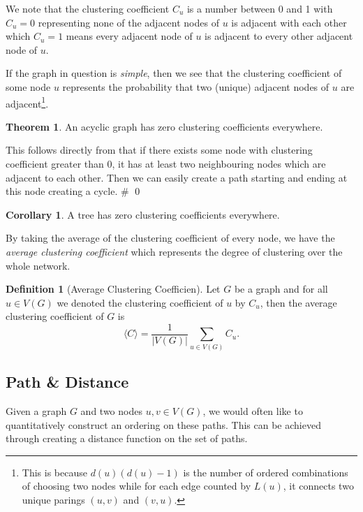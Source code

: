 \documentclass[
]{article}
\theoremstyle{definition}
\newtheorem{theorem}{Theorem}
\newtheorem{corollary}{Corollary}[theorem]
\theoremstyle{definition}
\newtheorem{definition}{Definition}[section]
\begin{document}
We note that the clustering coefficient \(C_u\) is a number between 0
and 1 with \(C_u = 0\) representing none of the adjacent nodes of \(u\)
is adjacent with each other which \(C_u = 1\) means every adjacent node
of \(u\) is adjacent to every other adjacent node of \(u\).

If the graph in question is \emph{simple}, then we see that the
clustering coefficient of some node \(u\) represents the probability
that two (unique) adjacent nodes of \(u\) are
adjacent\footnote{This is because \(d(u)(d(u) - 1)\) 
is the number of ordered combinations of choosing two nodes while for each 
edge counted by \(L(u)\), it connects two unique parings \((u, v)\) and 
\((v, u)\).}.

\begin{theorem}
  An acyclic graph has zero clustering coefficients everywhere.
\end{theorem}
\proof

This follows directly from that if there exists some node with
clustering coefficient greater than 0, it has at least two neighbouring
nodes which are adjacent to each other. Then we can easily create a path
starting and ending at this node creating a cycle. \# \qed

\begin{corollary}
  A tree has zero clustering coefficients everywhere.
\end{corollary}

By taking the average of the clustering coefficient of every node, we
have the \emph{average clustering coefficient} which represents the
degree of clustering over the whole network.

\begin{definition}[Average Clustering Coefficien]
  Let \(G\) be a graph and for all \(u \in V(G)\) we denoted the clustering 
  coefficient of \(u\) by \(C_u\), then the average clustering coefficient of 
  \(G\) is
  \[\langle C \rangle = \frac{1}{\left| V(G) \right|} \sum_{u \in V(G)} C_u.\]
\end{definition}

\hypertarget{path-distance}{%
\subsection{Path \& Distance}\label{path-distance}}

Given a graph \(G\) and two nodes \(u, v \in V(G)\), we would often like
to quantitatively construct an ordering on these paths. This can be
achieved through creating a distance function on the set of paths.
\end{document}
